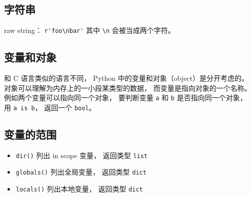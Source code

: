 \subsection{字符串}
raw string： \verb|r'foo\nbar'| 其中 \verb|\n| 会被当成两个字符。

\subsection{变量和对象}
和 C 语言类似的语言不同， Python 中的变量和对象（object）是分开考虑的。 对象可以理解为内存上的一小段某类型的数据， 而变量是指向对象的一个名称。 例如两个变量可以指向同一个对象， 要判断变量 \verb|a| 和 \verb|b| 是否指向同一个对象， 用 \verb|a is b|， 返回一个 \verb|bool|。

\subsection{变量的范围}
\begin{itemize}
\item \verb|dir()| 列出 in scope 变量， 返回类型 \verb|list|
\item \verb|globals()| 列出全局变量， 返回类型 \verb|dict|
\item \verb|locals()| 列出本地变量， 返回类型 \verb|dict|
\end{itemize}

